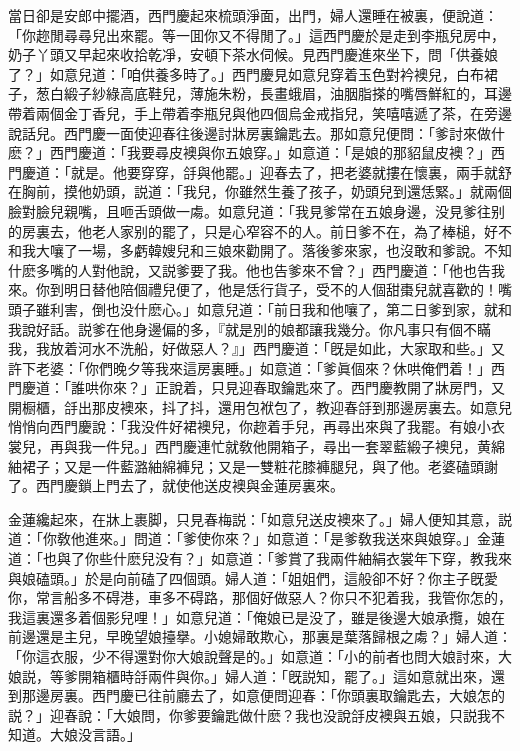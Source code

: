 當日卻是安郎中擺酒，西門慶起來梳頭淨面，出門，婦人還睡在被裏，便說道：「你趂閒尋尋兒出來罷。等一囬你又不得閒了。」這西門慶於是走到李瓶兒房中，奶子丫頭又早起來收拾乾凈，安頓下茶水伺候。見西門慶進來坐下，問「供養娘了？」如意兒道：「咱供養多時了。」西門慶見如意兒穿着玉色對衿襖兒，白布裙子，葱白緞子紗綠高底鞋兒，薄施朱粉，長畫蛾眉，油胭脂搽的嘴唇鮮紅的，耳邊帶着兩個金丁香兒，手上帶着李瓶兒與他四個烏金戒指兒，笑嘻嘻遞了茶，在旁邊說話兒。西門慶一面使迎春往後邊討牀房裏鑰匙去。那如意兒便問：「爹討來做什麽？」西門慶道：「我要尋皮襖與你五娘穿。」如意道：「是娘的那貂鼠皮襖？」西門慶道：「就是。他要穿穿，㧱與他罷。」迎春去了，把老婆就摟在懷裏，兩手就舒在胸前，摸他奶頭，説道：「我兒，你雖然生養了孩子，奶頭兒到還恁緊。」就兩個臉對臉兒親嘴，且咂舌頭做一䖏。如意兒道：「我見爹常在五娘身邊，没見爹往别的房裏去，他老人家别的罷了，只是心窄容不的人。前日爹不在，為了棒槌，好不和我大嚷了一場，多虧韓嫂兒和三娘來勸開了。落後爹來家，也沒敢和爹說。不知什麽多嘴的人對他說，又説爹要了我。他也告爹來不曾？」西門慶道：「他也告我來。你到明日替他陪個禮兒便了，他是恁行貨子，受不的人個甜棗兒就喜歡的！嘴頭子雖利害，倒也没什麽心。」如意兒道：「前日我和他嚷了，第二日爹到家，就和我說好話。説爹在他身邊偏的多，『就是別的娘都讓我幾分。你凡事只有個不瞞我，我放着河水不洗船，好做惡人？』」西門慶道：「旣是如此，大家取和些。」又許下老婆：「你們晚夕等我來這房裏睡。」如意道：「爹眞個來？休哄俺們着！」西門慶道：「誰哄你來？」正說着，只見迎春取鑰匙來了。西門慶教開了牀房門，又開橱櫃，㧱出那皮襖來，抖了抖，還用包袱包了，教迎春㧱到那邊房裏去。如意兒悄悄向西門慶說：「我没件好裙襖兒，你趂着手兒，再尋出來與了我罷。有娘小衣裳兒，再與我一件兒。」西門慶連忙就敎他開箱子，尋出一套翠藍緞子襖兒，黄綿紬裙子；又是一件藍潞紬綿褲兒；又是一雙粧花膝褲腿兒，與了他。老婆磕頭謝了。西門慶鎖上門去了，就使他送皮襖與金蓮房裏來。

金蓮纔起來，在牀上裹脚，只見春梅説：「如意兒送皮襖來了。」婦人便知其意，説道：「你敎他進來。」問道：「爹使你來？」如意道：「是爹敎我送來與娘穿。」金蓮道：「也與了你些什麽兒没有？」如意道：「爹賞了我兩件紬絹衣裳年下穿，教我來與娘磕頭。」於是向前磕了四個頭。婦人道：「姐姐們，這般卻不好？你主子旣愛你，常言船多不碍港，車多不碍路，那個好做惡人？你只不犯着我，我管你怎的，我這裏還多着個影兒哩！」如意兒道：「俺娘已是没了，雖是後邊大娘承攬，娘在前邊還是主兒，早晚望娘擡擧。小媳婦敢欺心，那裏是葉落歸根之䖏？」婦人道：「你這衣服，少不得還對你大娘說聲是的。」如意道：「小的前者也問大娘討來，大娘説，等爹開箱櫃時㧱兩件與你。」婦人道：「旣説知，罷了。」這如意就出來，還到那邊房裏。西門慶已往前廳去了，如意便問迎春：「你頭裏取鑰匙去，大娘怎的説？」迎春說：「大娘問，你爹要鑰匙做什麽？我也没說㧱皮襖與五娘，只説我不知道。大娘没言語。」

